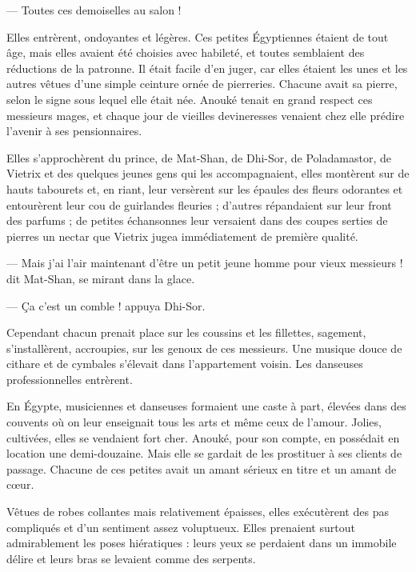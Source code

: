 \documentclass[a4paper, 11pt, oneside, polutonikogreek, french]{article}
\begin{document}
--- Toutes ces demoiselles au salon !

Elles entrèrent, ondoyantes et légères. Ces petites Égyptiennes étaient de tout âge, mais elles avaient été choisies avec habileté, et toutes semblaient des réductions de la patronne. Il était facile d'en juger, car elles étaient les unes et les autres vêtues d'une simple ceinture ornée de pierreries. Chacune avait sa pierre, selon le signe sous lequel elle était née. Anouké tenait en grand respect ces messieurs mages, et chaque jour de vieilles devineresses venaient chez elle prédire l'avenir à ses pensionnaires.

Elles s'approchèrent du prince, de Mat-Shan, de Dhi-Sor, de Poladamastor, de Vietrix et des quelques jeunes gens qui les accompagnaient, elles montèrent sur de hauts tabourets et, en riant, leur versèrent sur les épaules des fleurs odorantes et entourèrent leur cou de guirlandes fleuries ; d'autres répandaient sur leur front des parfums ; de petites échansonnes leur versaient dans des coupes serties de pierres un nectar que Vietrix jugea immédiatement de première qualité.

--- Mais j'ai l'air maintenant d'être un petit jeune homme pour vieux messieurs ! dit Mat-Shan, se mirant dans la glace.

--- Ça c'est un comble ! appuya Dhi-Sor.

\bigskip
\centerline{\EightStarTaper}
\centerline{\EightStarTaper\EightStarTaper}
\bigskip

Cependant chacun prenait place sur les coussins et les fillettes, sagement, s'installèrent, accroupies, sur les genoux de ces messieurs. Une musique douce de cithare et de cymbales s'élevait dans l'appartement voisin. Les danseuses professionnelles entrèrent.

En Égypte, musiciennes et danseuses formaient une caste à part, élevées dans des couvents où on leur enseignait tous les arts et même ceux de l'amour. Jolies, cultivées, elles se vendaient fort cher. Anouké, pour son compte, en possédait en location une demi-douzaine. Mais elle se gardait de les prostituer à ses clients de passage. Chacune de ces petites avait un amant sérieux en titre et un amant de cœur.

Vêtues de robes collantes mais relativement épaisses, elles exécutèrent des pas compliqués et d'un sentiment assez voluptueux. Elles prenaient surtout admirablement les poses hiératiques : leurs yeux se perdaient dans un immobile délire et leurs bras se levaient comme des serpents.
\end{document}
